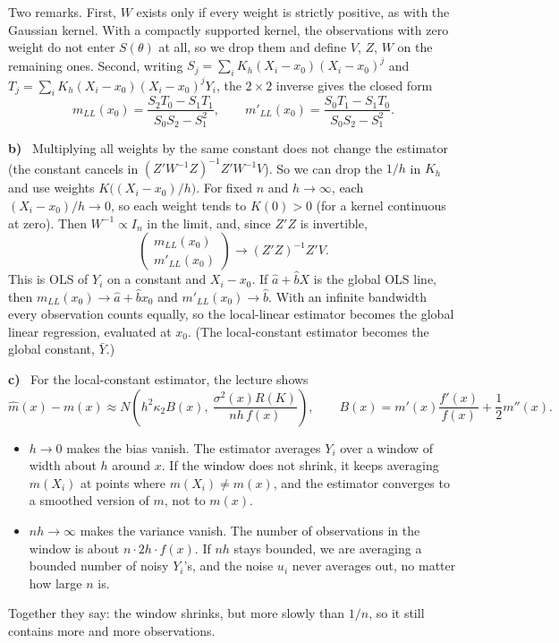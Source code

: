 \documentclass[11pt]{article}
\theoremstyle{plain}
\newcommand{\itm}[1]{\par\textbf{#1)}\ }
\begin{document}
Two remarks. First, $W$ exists only if every weight is strictly positive, as with the Gaussian kernel. With a compactly supported kernel, the observations with zero weight do not enter $S(\theta)$ at all, so we drop them and define $V$, $Z$, $W$ on the remaining ones. Second, writing $S_j=\sum_i K_h(X_i-x_0)(X_i-x_0)^j$ and $T_j=\sum_i K_h(X_i-x_0)(X_i-x_0)^jY_i$, the $2\times 2$ inverse gives the closed form
\[
m_{LL}(x_0) = \frac{S_2T_0 - S_1T_1}{S_0S_2-S_1^2},\qquad m'_{LL}(x_0) = \frac{S_0T_1 - S_1T_0}{S_0S_2-S_1^2}.
\]

\itm{b}
Multiplying all weights by the same constant does not change the estimator (the constant cancels in $(Z'W^{-1}Z)^{-1}Z'W^{-1}V$). So we can drop the $1/h$ in $K_h$ and use weights $K\big((X_i-x_0)/h\big)$. For fixed $n$ and $h\to\infty$, each $(X_i-x_0)/h\to 0$, so each weight tends to $K(0)>0$ (for a kernel continuous at zero). Then $W^{-1}\propto I_n$ in the limit, and, since $Z'Z$ is invertible,
\[
\begin{pmatrix}m_{LL}(x_0)\\ m'_{LL}(x_0)\end{pmatrix} \longrightarrow (Z'Z)^{-1}Z'V .
\]
This is OLS of $Y_i$ on a constant and $X_i-x_0$. If $\hat a+\hat bX$ is the global OLS line, then $m_{LL}(x_0)\to\hat a+\hat bx_0$ and $m'_{LL}(x_0)\to\hat b$. With an infinite bandwidth every observation counts equally, so the local-linear estimator becomes the global linear regression, evaluated at $x_0$. (The local-constant estimator becomes the global constant, $\bar Y$.)

\itm{c}
For the local-constant estimator, the lecture shows
\[
\hat m(x) - m(x) \approx N\left(h^2\kappa_2 B(x),\ \frac{\sigma^2(x)R(K)}{nh\,f(x)}\right),\qquad B(x) = m'(x)\frac{f'(x)}{f(x)} + \frac12m''(x).
\]
\begin{itemize}
	\item $h\to 0$ makes the bias vanish. The estimator averages $Y_i$ over a window of width about $h$ around $x$. If the window does not shrink, it keeps averaging $m(X_i)$ at points where $m(X_i)\ne m(x)$, and the estimator converges to a smoothed version of $m$, not to $m(x)$.
	\item $nh\to\infty$ makes the variance vanish. The number of observations in the window is about $n\cdot 2h\cdot f(x)$. If $nh$ stays bounded, we are averaging a bounded number of noisy $Y_i$'s, and the noise $u_i$ never averages out, no matter how large $n$ is.
\end{itemize}
Together they say: the window shrinks, but more slowly than $1/n$, so it still contains more and more observations.
\end{document}

